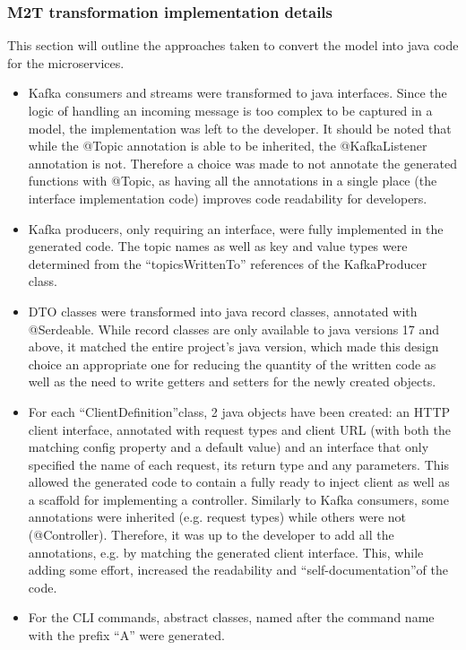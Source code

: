 \documentclass[parskip=full]{article}
\begin{document}
    \subsubsection{M2T transformation implementation details}
    This section will outline the approaches taken to convert the model into java code for the microservices.
    \begin{itemize}
        \item	Kafka consumers and streams were transformed to java interfaces.
        Since the logic of handling an incoming message is too complex to be captured in a model, the implementation was left to the developer.
        It should be noted that while the @Topic annotation is able to be inherited, the @KafkaListener annotation is not.
        Therefore a choice was made to not annotate the generated functions with @Topic, as having all the annotations in a single place (the interface implementation code) improves code readability for developers.
        \item	Kafka producers, only requiring an interface, were fully implemented in the generated code.
        The topic names as well as key and value types were determined from the ``topicsWrittenTo'' references of the KafkaProducer class.
        \item	DTO classes were transformed into java record classes, annotated with @Serdeable.
        While record classes are only available to java versions 17 and above, it matched the entire project's java version, which made this design choice an appropriate one for reducing the quantity of the written code as well as the need to write getters and setters for the newly created objects.
        \item	For each ``ClientDefinition''class, 2 java objects have been created: an HTTP client interface, annotated with request types and client URL (with both the matching config property and a default value) and an interface that only specified the name of each request, its return type and any parameters.
        This allowed the generated code to contain a fully ready to inject client as well as a scaffold for implementing a controller.
        Similarly to Kafka consumers, some annotations were inherited (e.g. request types) while others were not (@Controller).
        Therefore, it was up to the developer to add all the annotations, e.g. by matching the generated client interface.
        This, while adding some effort, increased the readability and ``self-documentation''of the code.
        \item	For the CLI commands, abstract classes, named after the command name with the prefix ``A'' were generated.

\end{itemize}
\end{document}
